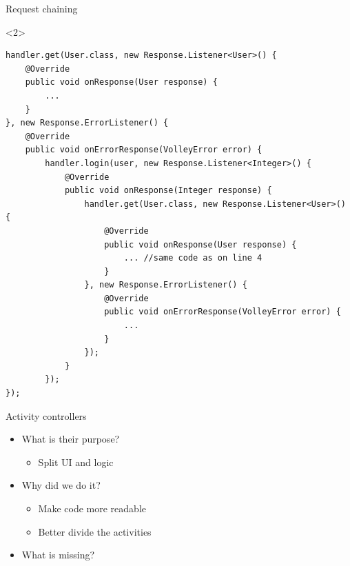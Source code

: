 \begin{frame}[fragile]{Request chaining}
\begin{onlyenv}<2>
\begin{center}
\begin{minipage}[H]{0.9\linewidth}
\begin{lstlisting}    
handler.get(User.class, new Response.Listener<User>() {
	@Override
    public void onResponse(User response) {
    	... 
    }
}, new Response.ErrorListener() {
	@Override
    public void onErrorResponse(VolleyError error) {
    	handler.login(user, new Response.Listener<Integer>() {
        	@Override
            public void onResponse(Integer response) {
            	handler.get(User.class, new Response.Listener<User>() {
                	@Override
                    public void onResponse(User response) {
                    	... //same code as on line 4
                    }
                }, new Response.ErrorListener() {
                    @Override
                    public void onErrorResponse(VolleyError error) {
						...
                    }
                });
            }
        });
});
\end{lstlisting} 
\end{minipage}
\end{center}
\end{onlyenv}
\end{frame}

\begin{frame}{Activity controllers}
\begin{itemize}
  \item What is their purpose?
  \begin{itemize}
  \item Split UI and logic
\end{itemize}
  \item Why did we do it?
  \begin{itemize}
  \item Make code more readable
  \item Better divide the activities
\end{itemize}
  \item What is missing?
\end{itemize}
\end{frame}

